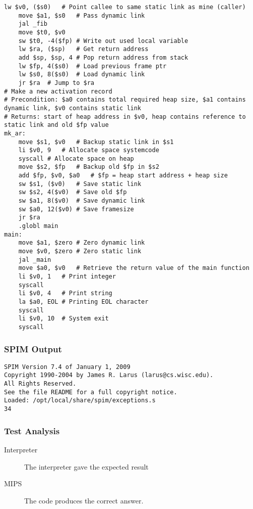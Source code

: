 \begin{lstlisting}[showstringspaces=false,breaklines=true,backgroundcolor=\color{light-gray}, captionpos=b]
	lw $v0, ($s0)	# Point callee to same static link as mine (caller)
	move $a1, $s0	# Pass dynamic link
	jal _fib
	move $t0, $v0
	sw $t0, -4($fp)	# Write out used local variable
	lw $ra, ($sp)	# Get return address
	add $sp, $sp, 4	# Pop return address from stack
	lw $fp, 4($s0)	# Load previous frame ptr
	lw $s0, 8($s0)	# Load dynamic link
	jr $ra	# Jump to $ra
# Make a new activation record
# Precondition: $a0 contains total required heap size, $a1 contains dynamic link, $v0 contains static link
# Returns: start of heap address in $v0, heap contains reference to static link and old $fp value
mk_ar:
	move $s1, $v0	# Backup static link in $s1
	li $v0, 9	# Allocate space systemcode
	syscall	# Allocate space on heap
	move $s2, $fp	# Backup old $fp in $s2
	add $fp, $v0, $a0	# $fp = heap start address + heap size
	sw $s1, ($v0)	# Save static link
	sw $s2, 4($v0)	# Save old $fp
	sw $a1, 8($v0)	# Save dynamic link
	sw $a0, 12($v0)	# Save framesize
	jr $ra
	.globl main
main:
	move $a1, $zero	# Zero dynamic link
	move $v0, $zero	# Zero static link
	jal _main
	move $a0, $v0	# Retrieve the return value of the main function
	li $v0, 1	# Print integer
	syscall
	li $v0, 4	# Print string
	la $a0, EOL	# Printing EOL character
	syscall
	li $v0, 10	# System exit
	syscall

\end{lstlisting}\subsubsection{SPIM Output}
\begin{verbatim}
SPIM Version 7.4 of January 1, 2009
Copyright 1990-2004 by James R. Larus (larus@cs.wisc.edu).
All Rights Reserved.
See the file README for a full copyright notice.
Loaded: /opt/local/share/spim/exceptions.s
34
\end{verbatim}
\subsubsection{Test Analysis}
\begin{description}
	\item[Interpreter] The interpreter gave the expected result
	\item[MIPS] The code produces the correct answer.
\end{description}
